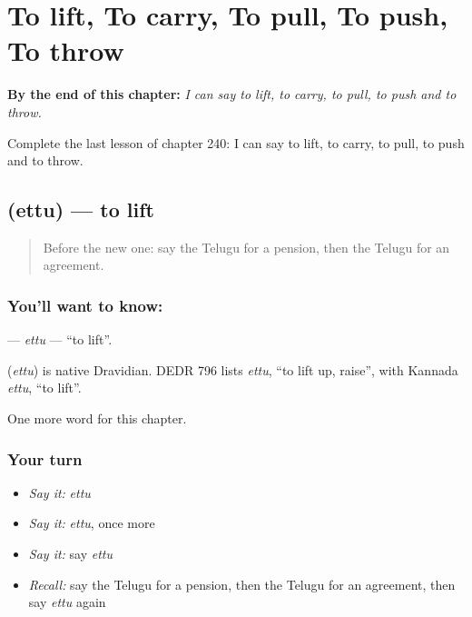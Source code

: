 
\chapter{To lift, To carry, To pull, To push, To throw}
\label{ch:te-to-lift-to-carry-to-pull-to-push-to-throw}

\begin{chapteropening}
\textbf{By the end of this chapter:} \emph{I can say to lift, to carry, to pull, to push and to throw.}

Complete the last lesson of chapter 240: I can say to lift, to carry, to pull, to push and to throw.
\end{chapteropening}

\section[\texorpdfstring{\te{ఎత్తు} (ettu)}{ఎత్తు (ettu)}]{ (ettu) — to lift}

\label{lesson:TE-C240-ettu}



\begin{quote}
Before the new one: say the Telugu for a pension, then the Telugu for an agreement.
\end{quote}

\subsection*{You'll want to know: }
\textbf{} — \emph{ettu} — \textquotedblleft{}to lift\textquotedblright{}.

\begin{cousinweb}
\textbf{} (\emph{ettu}) is native Dravidian. DEDR 796 lists \emph{ettu}, \textquotedblleft{}to lift up, raise\textquotedblright{}, with Kannada \emph{ettu}, \textquotedblleft{}to lift\textquotedblright{}.
\end{cousinweb}

\begin{grammarlens}[title={What you've built}]
One more word for this chapter.
\end{grammarlens}

\subsection*{Your turn}
\begin{itemize}
\raggedright
  \item \emph{Say it:} \emph{ettu}
  \item \emph{Say it:} \emph{ettu}, once more
  \item \emph{Say it:} say \emph{ettu}
  \item \emph{Recall:} say the Telugu for a pension, then the Telugu for an agreement, then say \emph{ettu} again
\end{itemize}

